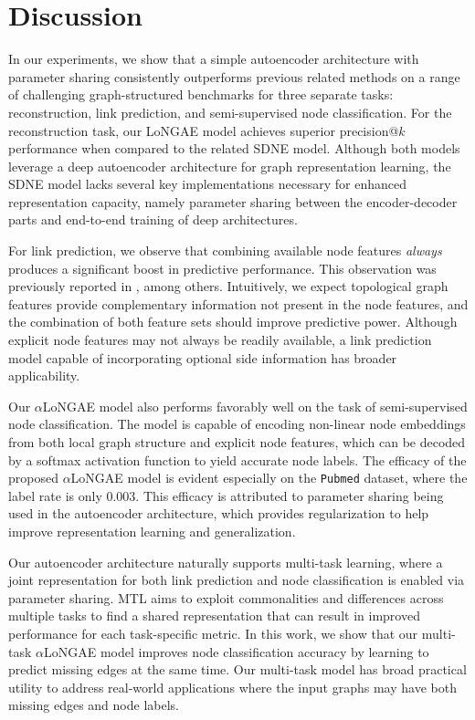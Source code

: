 \documentclass[letterpaper, conference]{IEEEtran}  %
\begin{document}
%
\section{Discussion}
%
In our experiments, we show that a simple autoencoder architecture with parameter sharing consistently outperforms previous related methods on a range of challenging graph-structured benchmarks for three separate tasks: reconstruction, link prediction, and semi-supervised node classification. For the reconstruction task, our LoNGAE model achieves superior precision@$k$ performance when compared to the related SDNE model. Although both models leverage a deep autoencoder architecture for graph representation learning, the SDNE model lacks several key implementations necessary for enhanced representation capacity, namely parameter sharing between the encoder-decoder parts and end-to-end training of deep architectures.

For link prediction, we observe that combining available node features \emph{always} produces a significant boost in predictive performance. This observation was previously reported in \cite{Menon:2011,VGAE:2016}, among others. Intuitively, we expect topological graph features provide complementary information not present in the node features, and the combination of both feature sets should improve predictive power. Although explicit node features may not always be readily available, a link prediction model capable of incorporating optional side information has broader applicability.

Our $\alpha$LoNGAE model also performs favorably well on the task of semi-supervised node classification. The model is capable of encoding non-linear node embeddings from both local graph structure and explicit node features, which can be decoded by a softmax activation function to yield accurate node labels. The efficacy of the proposed $\alpha$LoNGAE model is evident especially on the \texttt{Pubmed} dataset, where the label rate is only 0.003. This efficacy is attributed to parameter sharing being used in the autoencoder architecture, which provides regularization to help improve representation learning and generalization.

Our autoencoder architecture naturally supports multi-task learning, where a joint representation for both link prediction and node classification is enabled via parameter sharing. MTL aims to exploit commonalities and differences across multiple tasks to find a shared representation that can result in improved performance for each task-specific metric. In this work, we show that our multi-task $\alpha$LoNGAE model improves node classification accuracy by learning to predict missing edges at the same time. Our multi-task model has broad practical utility to address real-world applications where the input graphs may have both missing edges and node labels.
\end{document}
